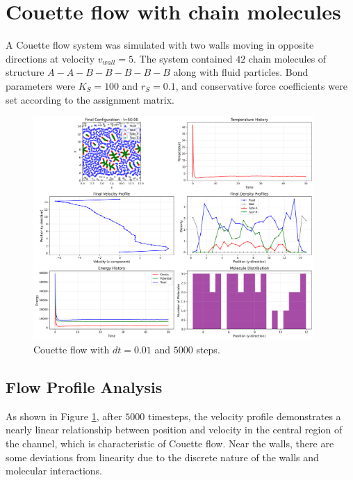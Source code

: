 \section{Couette flow with chain molecules}
A Couette flow system was simulated with two walls moving in opposite directions at velocity $v_{wall} = 5$. The system contained $42$ chain molecules of structure $A-A-B-B-B-B-B$ along with fluid particles. Bond parameters were $K_S = 100$ and $r_S = 0.1$, and conservative force coefficients were set according to the assignment matrix.
\begin{figure}[H]
	\begin{center}
		\includegraphics[width=0.95\textwidth]{figures/couette_final_vis.png}
	\end{center}
	\caption{Couette flow with $dt = 0.01$ and $5000$ steps.}\label{fig:couette}
\end{figure}
\subsection{Flow Profile Analysis}
As shown in Figure \ref{fig:couette}, after $5000$ timesteps, the velocity profile demonstrates a nearly linear relationship between position and velocity in the central region of the channel, which is characteristic of Couette flow. Near the walls, there are some deviations from linearity due to the discrete nature of the walls and molecular interactions.
